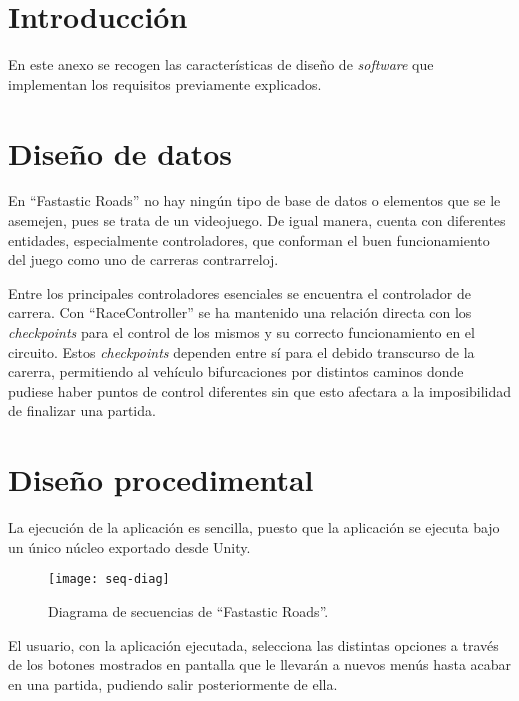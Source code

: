 
\section{Introducción}

En este anexo se recogen las características de diseño de \textit{software} que implementan los requisitos previamente explicados.

\section{Diseño de datos}

En ``Fastastic Roads'' no hay ningún tipo de base de datos o elementos que se le asemejen, pues se trata de un videojuego. De igual manera, cuenta con diferentes entidades, especialmente controladores, que conforman el buen funcionamiento del juego como uno de carreras contrarreloj.

Entre los principales controladores esenciales se encuentra el controlador de carrera. Con ``RaceController'' se ha mantenido una relación directa con los \textit{checkpoints} para el control de los mismos y su correcto funcionamiento en el circuito. Estos \textit{checkpoints} dependen entre sí para el debido transcurso de la carerra, permitiendo al vehículo bifurcaciones por distintos caminos donde pudiese haber puntos de control diferentes sin que esto afectara a la imposibilidad de finalizar una partida. 


\section{Diseño procedimental}

La ejecución de la aplicación es sencilla, puesto que la aplicación se ejecuta bajo un único núcleo exportado desde Unity.

\begin{figure}[h]
	\centering
	\texttt{[image: seq-diag]}
	\caption{Diagrama de secuencias de ``Fastastic Roads''.}
	\label{fig:seq-diag}
\end{figure}

El usuario, con la aplicación ejecutada, selecciona las distintas opciones a través de los botones mostrados en pantalla que le llevarán a nuevos menús hasta acabar en una partida, pudiendo salir posteriormente de ella.

